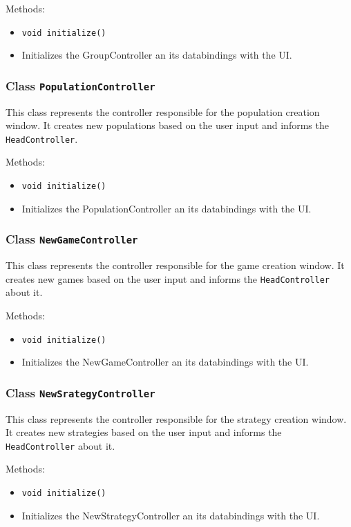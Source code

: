 \documentclass[parskip=full,11pt]{scrartcl}
\begin{document}
Methods:
\begin{itemize}\itemsep -10pt
\item \texttt{void initialize()}
\item[] Initializes the GroupController an its databindings with the UI.
\end{itemize}

\subsubsection{Class \texttt{PopulationController}}
This class represents the controller responsible for the population creation window. It creates new populations based on the user input and informs the \texttt{HeadController}.

Methods:
\begin{itemize}\itemsep -10pt
\item \texttt{void initialize()}
\item[] Initializes the PopulationController an its databindings with the UI.
\end{itemize}

\subsubsection{Class \texttt{NewGameController}}
This class represents the controller responsible for the game creation window.
It creates new games based on the user input and informs the \texttt{HeadController} about it.

Methods:
\begin{itemize}\itemsep -10pt
\item \texttt{void initialize()}
\item[] Initializes the NewGameController an its databindings with the UI.
\end{itemize}

\subsubsection{Class \texttt{NewSrategyController}}
This class represents the controller responsible for the strategy creation window. It creates new strategies based on the user input and informs the \texttt{HeadController} about it.

Methods:
\begin{itemize}\itemsep -10pt
\item \texttt{void initialize()}
\item[] Initializes the NewStrategyController an its databindings with the UI.
\end{itemize}
\end{document}
